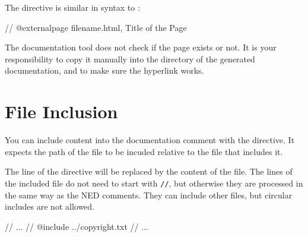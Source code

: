 The  directive is similar in syntax to :

\begin{ned}
// @externalpage filename.html, Title of the Page
\end{ned}

The documentation tool does not check if the page exists
or not. It is your responsibility to copy it manually into
the directory of the generated documentation, and to make
sure the hyperlink works.

\section{File Inclusion}

You can include content into the documentation comment with the
 directive. It expects the path of the file to be incuded
relative to the file that includes it.

The line of the  directive will be replaced by the
content of the file. The lines of the included file do not need
to start with \texttt{//}, but otherwise they are processed in the same way
as the NED comments. They can include other files, but circular
includes are not allowed.

\begin{ned}
// ...
// @include ../copyright.txt
// ...
\end{ned}

